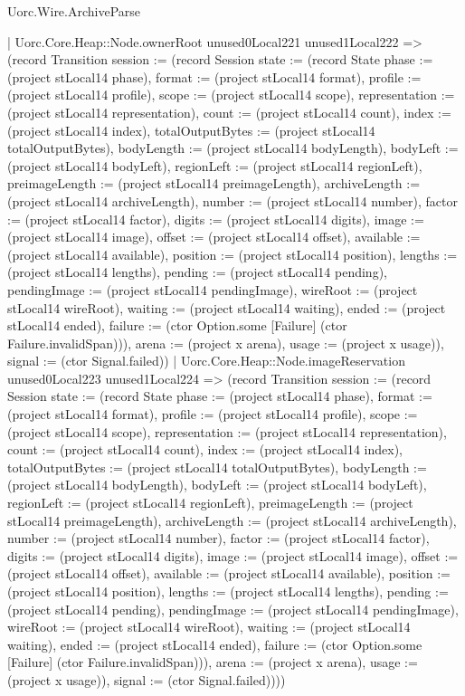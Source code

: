 \begin{lexlean}{Uorc.Wire.ArchiveParse}
\begin{semanticmodule}
{            | Uorc.Core.Heap::Node.ownerRoot unused0Local221 unused1Local222 => (record Transition {session := (record Session {state := (record State {phase := (project stLocal14 phase), format := (project stLocal14 format), profile := (project stLocal14 profile), scope := (project stLocal14 scope), representation := (project stLocal14 representation), count := (project stLocal14 count), index := (project stLocal14 index), totalOutputBytes := (project stLocal14 totalOutputBytes), bodyLength := (project stLocal14 bodyLength), bodyLeft := (project stLocal14 bodyLeft), regionLeft := (project stLocal14 regionLeft), preimageLength := (project stLocal14 preimageLength), archiveLength := (project stLocal14 archiveLength), number := (project stLocal14 number), factor := (project stLocal14 factor), digits := (project stLocal14 digits), image := (project stLocal14 image), offset := (project stLocal14 offset), available := (project stLocal14 available), position := (project stLocal14 position), lengths := (project stLocal14 lengths), pending := (project stLocal14 pending), pendingImage := (project stLocal14 pendingImage), wireRoot := (project stLocal14 wireRoot), waiting := (project stLocal14 waiting), ended := (project stLocal14 ended), failure := (ctor Option.some [Failure] (ctor Failure.invalidSpan))}), arena := (project x arena), usage := (project x usage)}), signal := (ctor Signal.failed)})
            | Uorc.Core.Heap::Node.imageReservation unused0Local223 unused1Local224 => (record Transition {session := (record Session {state := (record State {phase := (project stLocal14 phase), format := (project stLocal14 format), profile := (project stLocal14 profile), scope := (project stLocal14 scope), representation := (project stLocal14 representation), count := (project stLocal14 count), index := (project stLocal14 index), totalOutputBytes := (project stLocal14 totalOutputBytes), bodyLength := (project stLocal14 bodyLength), bodyLeft := (project stLocal14 bodyLeft), regionLeft := (project stLocal14 regionLeft), preimageLength := (project stLocal14 preimageLength), archiveLength := (project stLocal14 archiveLength), number := (project stLocal14 number), factor := (project stLocal14 factor), digits := (project stLocal14 digits), image := (project stLocal14 image), offset := (project stLocal14 offset), available := (project stLocal14 available), position := (project stLocal14 position), lengths := (project stLocal14 lengths), pending := (project stLocal14 pending), pendingImage := (project stLocal14 pendingImage), wireRoot := (project stLocal14 wireRoot), waiting := (project stLocal14 waiting), ended := (project stLocal14 ended), failure := (ctor Option.some [Failure] (ctor Failure.invalidSpan))}), arena := (project x arena), usage := (project x usage)}), signal := (ctor Signal.failed)})))
}
\end{semanticmodule}
\end{lexlean}
